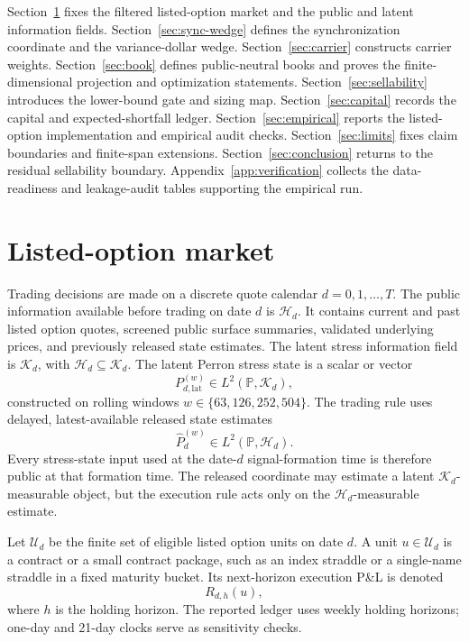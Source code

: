 \documentclass[11pt,a4paper]{amsart}
\theoremstyle{plain}
\theoremstyle{definition}
\theoremstyle{remark}
\newcommand{\PP}{\mathbb{P}}
\newcommand{\cH}{\mathcal{H}}
\newcommand{\cK}{\mathcal{K}}
\newcommand{\cU}{\mathcal{U}}
\begin{document}
Section~\ref{sec:setup} fixes the filtered listed-option market and the public and latent
information fields.  Section~\ref{sec:sync-wedge} defines the synchronization coordinate and the
variance-dollar wedge.  Section~\ref{sec:carrier} constructs carrier weights.  Section~\ref{sec:book}
defines public-neutral books and proves the finite-dimensional projection and optimization
statements.  Section~\ref{sec:sellability} introduces the lower-bound gate and sizing map.
Section~\ref{sec:capital} records the capital and expected-shortfall ledger.
Section~\ref{sec:empirical} reports the listed-option implementation and empirical audit checks.
Section~\ref{sec:limits} fixes claim boundaries and finite-span extensions.  Section~\ref{sec:conclusion}
returns to the residual sellability boundary.  Appendix~\ref{app:verification} collects the
data-readiness and leakage-audit tables supporting the empirical run.

\section{Listed-option market}\label{sec:setup}

Trading decisions are made on a discrete quote calendar \(d=0,1,\ldots,T\).  The public information
available before trading on date \(d\) is \(\cH_d\).  It contains current and past listed option
quotes, screened public surface summaries, validated underlying prices, and previously released
state estimates.  The latent stress information field is \(\cK_d\), with
\(\cH_d\subseteq\cK_d\).  The latent Perron stress state is a scalar or vector
\[
        P_{d,\mathrm{lat}}^{(w)}\in L^2(\PP,\cK_d),
\]
constructed on rolling windows \(w\in\{63,126,252,504\}\).  The trading rule uses delayed,
latest-available released state estimates
\[
        \widehat P_d^{(w)}\in L^2(\PP,\cH_d).
\]
Every stress-state input used at the date-\(d\) signal-formation time is therefore public at that
formation time.  The released coordinate may estimate a latent \(\cK_d\)-measurable object, but
the execution rule acts only on the \(\cH_d\)-measurable estimate.

Let \(\cU_d\) be the finite set of eligible listed option units on date \(d\).  A unit
\(u\in\cU_d\) is a contract or a small contract package, such as an index straddle or a single-name
straddle in a fixed maturity bucket.  Its next-horizon execution P\&L is denoted
\[
        R_{d,h}(u),
\]
where \(h\) is the holding horizon.  The reported ledger uses weekly holding horizons; one-day and
21-day clocks serve as sensitivity checks.
\end{document}

